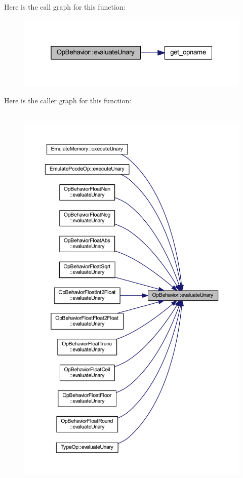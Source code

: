 Here is the call graph for this function\+:
\nopagebreak
\begin{figure}[H]
\begin{center}
\leavevmode
\includegraphics[width=319pt]{class_op_behavior_acd4f5a1c0dee0414f3c541620b88fe45_cgraph}
\end{center}
\end{figure}
Here is the caller graph for this function\+:
\nopagebreak
\begin{figure}[H]
\begin{center}
\leavevmode
\includegraphics[height=550pt]{class_op_behavior_acd4f5a1c0dee0414f3c541620b88fe45_icgraph}
\end{center}
\end{figure}
\mbox{\label{class_op_behavior_ad18c6673c9092dbfe3459224093998e8}} 
